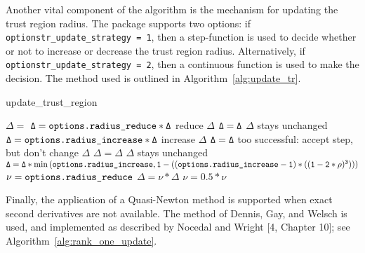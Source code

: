 Another vital component of the algorithm is the mechanism for updating the trust region radius.  The package supports two options: if {\tt options\ct tr\_update\_strategy = 1}, then 
a step-function is used to 
  decide whether or not to increase or decrease the trust region radius.  Alternatively, if
{\tt options\ct tr\_update\_strategy = 2}, then a continuous function is used to make the 
decision.  The method used is outlined in Algorithm~\ref{alg:update_tr}.

\begin{algorithm}
\caption{update\_trust\_region}
\label{alg:update_tr}
\begin{algorithmic}[1]    
   $\Delta = $ 
      \State $\tt \Delta = \text{\tt options.radius\_reduce} * \Delta$
      \Comment reduce $\Delta$
      \State $\tt \Delta = \Delta$
      \Comment $\Delta$ stays unchanged
      \State $\tt \Delta = \text{\tt options.radius\_increase} * \Delta$
      \Comment increase $\Delta$
      \State $\tt \Delta = \Delta$
      \Comment too successful: accept step, but don't change $\Delta$
      \EndIf
    \State [on first call, set $\nu = 2.0$]
        \State $\Delta = \Delta$
        \Comment $\Delta$ stays unchanged
        \State $\tt \Delta = \Delta * \min\left(\text{\tt options.radius\_increase},  
          1 - \left( (\text{\tt options.radius\_increase} -1)*((1 - 2*\rho)^3)  \right)\right)$
        \State $\tt \nu = \text{\tt options.radius\_reduce}$
        \State $ \Delta = \nu * \Delta$
        \State $ \nu = 0.5 * \nu$
      \EndIf
    \EndIf
  \end{algorithmic}
\end{algorithm}

Finally, the application of a Quasi-Newton method is supported when exact second derivatives are not available.  The method of Dennis, Gay, and Welsch  is used, and implemented as described by Nocedal and Wright [4, Chapter 10]; see Algorithm~\ref{alg:rank_one_update}.

